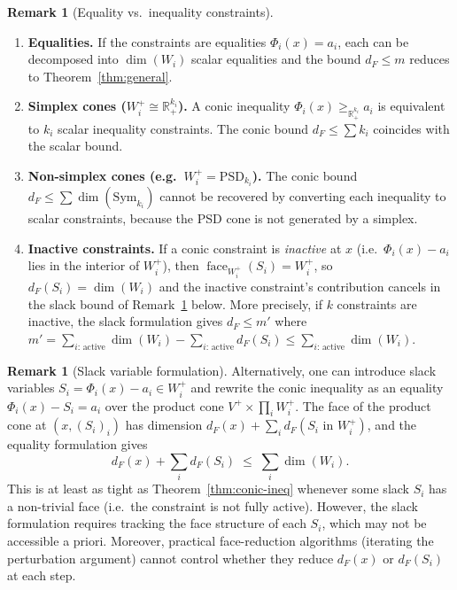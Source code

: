 \documentclass[11pt,a4paper]{article}
\theoremstyle{definition}
\newtheorem{remark}[theorem]{Remark}
\newcommand{\R}{\mathbb{R}}
\newcommand{\face}{\operatorname{face}}
\newcommand{\PSD}{\mathrm{PSD}}
\newcommand{\Sym}{\mathrm{Sym}}
\begin{document}
\begin{remark}[Equality vs.\ inequality constraints]
\label{rmk:eq-vs-ineq}
\leavevmode
\begin{enumerate}
\item \textbf{Equalities.}
  If the constraints are equalities $\Phi_i(x) = a_i$, each
  can be decomposed into $\dim(W_i)$ scalar equalities and
  the bound $d_F \leq m$ reduces to Theorem~\ref{thm:general}.

\item \textbf{Simplex cones ($W_i^+ \cong \R_+^{k_i}$).}
  A conic inequality $\Phi_i(x) \geq_{\R_+^{k_i}} a_i$ is
  equivalent to $k_i$ scalar inequality constraints.  The conic
  bound $d_F \leq \sum k_i$ coincides with the scalar bound.

\item \textbf{Non-simplex cones (e.g.\ $W_i^+ = \PSD_{k_i}$).}
  The conic bound $d_F \leq \sum \dim(\Sym_{k_i})$ cannot be
  recovered by converting each inequality to scalar constraints,
  because the PSD cone is not generated by a simplex.

\item \textbf{Inactive constraints.}
  If a conic constraint is \emph{inactive} at $x$ (i.e.\
  $\Phi_i(x) - a_i$ lies in the interior of $W_i^+$), then
  $\face_{W_i^+}(S_i) = W_i^+$, so $d_F(S_i) = \dim(W_i)$
  and the inactive constraint's contribution cancels in the
  slack bound of Remark~\ref{rmk:slack} below.
  More precisely, if $k$ constraints are inactive, the slack
  formulation gives $d_F \leq m'$ where
  $m' = \sum_{i:\, \text{active}} \dim(W_i)
        - \sum_{i:\, \text{active}} d_F(S_i)
       \leq \sum_{i:\, \text{active}} \dim(W_i)$.
\end{enumerate}
\end{remark}

\begin{remark}[Slack variable formulation]
\label{rmk:slack}
Alternatively, one can introduce slack variables
$S_i = \Phi_i(x) - a_i \in W_i^+$ and rewrite the conic
inequality as an equality $\Phi_i(x) - S_i = a_i$ over the
product cone $V^+ \times \prod_i W_i^+$.  The face of the product
cone at $(x, (S_i)_i)$ has dimension
$d_F(x) + \sum_i d_F(S_i \text{ in } W_i^+)$, and the equality
formulation gives
\[
  d_F(x) + \sum_{i} d_F(S_i) \;\leq\; \sum_i \dim(W_i).
\]
This is at least as tight as Theorem~\ref{thm:conic-ineq}
whenever some slack $S_i$ has a non-trivial face (i.e.\ the
constraint is not fully active).  However, the slack formulation
requires tracking the face structure of each $S_i$, which may
not be accessible a priori.  Moreover, practical face-reduction
algorithms (iterating the perturbation argument) cannot control
whether they reduce $d_F(x)$ or $d_F(S_i)$ at each step.
\end{remark}
\end{document}
